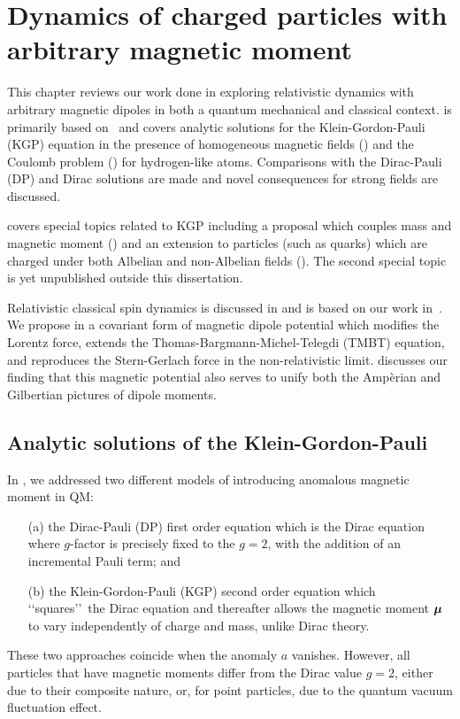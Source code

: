 \chapter{Dynamics of charged particles with arbitrary magnetic moment}
\label{chap:moment}
\noindent This chapter reviews our work done in exploring relativistic dynamics with arbitrary magnetic dipoles in both a quantum mechanical and classical context.  is primarily based on~\cite{Steinmetz:2018ryf} and covers analytic solutions for the Klein-Gordon-Pauli (KGP) equation in the presence of homogeneous magnetic fields () and the Coulomb problem () for hydrogen-like atoms. Comparisons with the Dirac-Pauli (DP) and Dirac solutions are made and novel consequences for strong fields are discussed.

 covers special topics related to KGP including a proposal which couples mass and magnetic moment () and an extension to particles (such as quarks) which are charged under both Albelian and non-Albelian fields (). The second special topic is yet unpublished outside this dissertation.

Relativistic classical spin dynamics is discussed in  and is based on our work in~\cite{Rafelski:2017hce}. We propose in  a covariant form of magnetic dipole potential which modifies the Lorentz force, extends the Thomas-Bargmann-Michel-Telegdi (TMBT) equation, and reproduces the Stern-Gerlach force in the non-relativistic limit.  discusses our finding that this magnetic potential also serves to unify both the Amp{\`e}rian and Gilbertian pictures of dipole moments.

\section{Analytic solutions of the Klein-Gordon-Pauli}
\label{sec:kgpapplications}
\noindent In , we addressed two different models of introducing anomalous magnetic moment in QM: 
\begin{enumerate}%
\item[(a)] the Dirac-Pauli (DP) first order equation which is the Dirac equation where $g$-factor is precisely fixed to the $g\!=\!2$, with the addition of an incremental Pauli term; and
\item[(b)] the Klein-Gordon-Pauli (KGP) second order equation which \lq\lq squares\rq\rq\ the Dirac equation and thereafter allows the magnetic moment $\boldsymbol{\mu}$ to vary independently of charge and mass, unlike Dirac theory.
\end{enumerate} 
These two approaches coincide when the anomaly $a$ vanishes. However, all particles that have magnetic moments differ from the Dirac value $g\!=\!2$, either due to their composite nature, or, for point particles, due to the quantum vacuum fluctuation effect.

